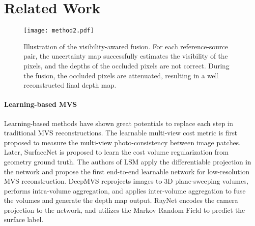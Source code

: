 \documentclass{bmvc2k}
\begin{document}
\section{Related Work}

\begin{figure}[]
	\centering
	\texttt{[image: method2.pdf]}
	\vspace{-8mm}
	\caption{Illustration of the visibility-awared fusion. For each reference-source pair, the uncertainty map successfully estimates the visibility of the pixels, and the depths of the occluded pixels are not correct. During the fusion, the occluded pixels are attenuated, resulting in a well reconstructed final depth map. }
	\vspace{-5mm}
	\label{fig:method2}
\end{figure}

\paragraph{Learning-based MVS}
Learning-based methods have shown great potentials to replace each step in traditional MVS reconstructions. The learnable multi-view cost metric \cite{hartmann2017learned} is first proposed to measure the multi-view photo-consistency between image patches. Later, SurfaceNet \cite{ji2017surfacenet} is proposed to learn the cost volume regularization from geometry ground truth. The authors of LSM \cite{kar2017learning} apply the differentiable projection in the network and propose the first end-to-end learnable network for low-resolution MVS reconstruction. DeepMVS \cite{huang2018deepmvs} reprojects images to 3D plane-sweeping volumes, performs intra-volume aggregation, and applies inter-volume aggregation to fuse the volumes and generate the depth map output. RayNet \cite{paschalidou2018raynet} encodes the camera projection to the network, and utilizes the Markov Random Field to predict the surface label. 
\end{document}
